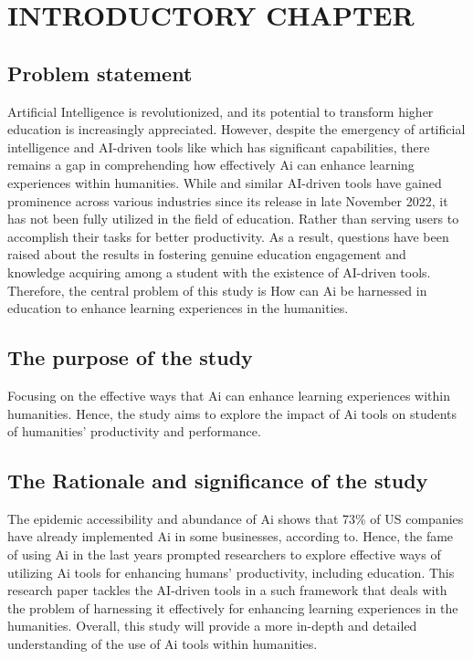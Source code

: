\chapter{INTRODUCTORY CHAPTER}\label{ch:introductory-chapter}


\section{Problem statement}\label{sec:problem-statement}
\justifying
Artificial Intelligence is revolutionized, and its potential
to transform higher education is increasingly appreciated.
However, despite the emergency of artificial intelligence and
AI-driven tools like which has significant capabilities,
there remains a gap in comprehending how effectively Ai can
enhance learning experiences within humanities.
While 
and similar AI-driven tools have gained prominence across various
industries since its release in late November 2022, it has not been
fully utilized in the field of education.
Rather than serving users
to accomplish their tasks for better productivity.
As a result, questions
have been raised about the results in fostering genuine education engagement
and knowledge acquiring among a student with the existence of AI-driven tools.
Therefore, the central problem of this study is How can Ai be harnessed
in education to enhance learning experiences in the humanities.


\section{The purpose of the study}\label{sec:the-purpose-of-the-study}
\justifying
Focusing on the effective ways that Ai can enhance learning experiences within humanities.
Hence, the study aims to
explore the impact of Ai tools on students of humanities' productivity and performance.


\section{The Rationale and significance of the study}\label{sec:the-rationale-and-significance-of-the-study}
\justifying
The epidemic accessibility and abundance of Ai shows that 73\% of US companies have already
implemented Ai in some businesses, according to\textcite{pricewaterhousecoopers}.
Hence, the fame of using Ai in the last years prompted researchers to explore effective ways of utilizing Ai tools
for enhancing humans' productivity, including education.
This research paper tackles the AI-driven tools in a such framework that
deals with the problem of harnessing it effectively for enhancing learning experiences in the humanities.
Overall, this study will provide a more in-depth and detailed understanding of the use of Ai tools within humanities.
